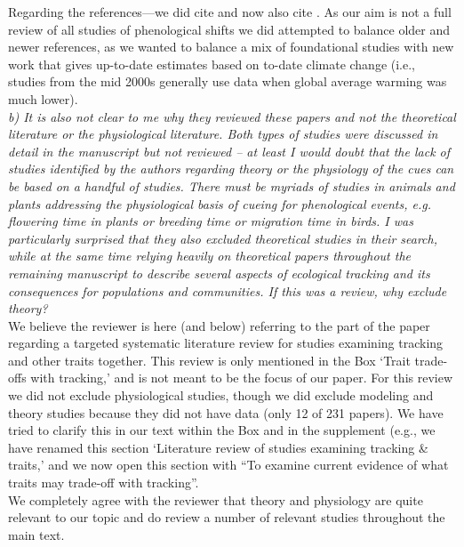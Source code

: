 \documentclass[11pt]{article}
\begin{document}
Regarding the references---we did cite \citep{Menzel:2006xn} and now also cite \citep{Parmesan:2006cr}. As our aim is not a full review of all studies of phenological shifts we did attempted to balance older and newer references, as we wanted to balance a mix of foundational studies with new work that gives up-to-date estimates based on to-date climate change (i.e., studies from the mid 2000s generally use data when global average warming was much lower).\\

\emph{b) It is also not clear to me why they reviewed these papers and not the theoretical
literature or the physiological literature. Both types of studies were discussed in detail in
the manuscript but not reviewed – at least I would doubt that the lack of studies identified
by the authors regarding theory or the physiology of the cues can be based on a handful of
studies. There must be myriads of studies in animals and plants addressing the physiological
basis of cueing for phenological events, e.g. flowering time in plants or breeding time or
migration time in birds. I was particularly surprised that they also excluded theoretical
studies in their search, while at the same time relying heavily on theoretical papers
throughout the remaining manuscript to describe several aspects of ecological tracking and
its consequences for populations and communities. If this was a review, why exclude theory?}\\

We believe the reviewer is here (and below) referring to the part of the paper regarding a targeted systematic literature review for studies examining tracking and other traits together. This review is only mentioned in the Box `Trait trade-offs with tracking,' and is not meant to be the focus of our paper. For this review we did not exclude physiological studies, though we did exclude modeling and theory studies because they did not have data (only 12 of 231 papers). We have tried to clarify this in our text within the Box and in the supplement (e.g., we have renamed this section `Literature review of studies examining tracking \& traits,' and we now open this section with ``To examine current evidence of what traits may trade-off with tracking''.\\

We completely agree with the reviewer that theory and physiology are quite relevant to our topic and do review a number of relevant studies throughout the main text.\\
\end{document}
